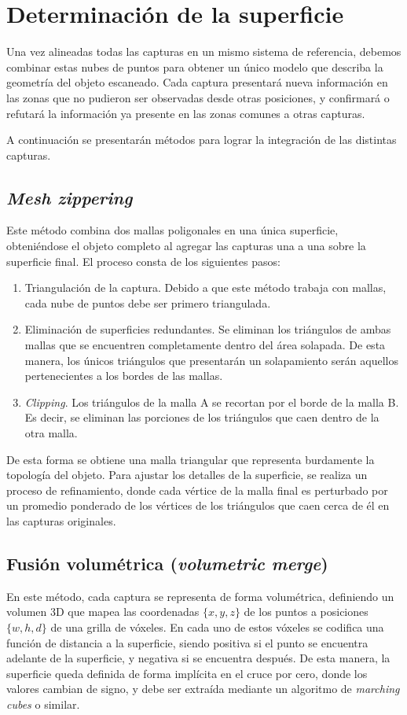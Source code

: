\section{Determinación de la superficie}
Una vez alineadas todas las capturas en un mismo sistema de referencia,
debemos combinar estas nubes de puntos para obtener un único modelo
que describa la geometría del objeto escaneado.
Cada captura presentará nueva información en las zonas
que no pudieron ser observadas desde otras posiciones,
y confirmará o refutará la información ya presente en las zonas comunes a otras capturas.

A continuación se presentarán métodos para lograr la integración de las distintas capturas.

\subsection{\emph{Mesh zippering}}
Este método combina dos mallas poligonales en una única superficie,
obteniéndose el objeto completo al agregar las capturas una a una sobre la superficie final.
El proceso consta de los siguientes pasos:
\begin{enumerate}
	\item Triangulación de la captura.
		Debido a que este método trabaja con mallas, cada nube de puntos debe ser primero triangulada.
	\item Eliminación de superficies redundantes.
		Se eliminan los triángulos de ambas mallas que se encuentren completamente dentro del área solapada.
		De esta manera, los únicos triángulos que presentarán un solapamiento
		serán aquellos pertenecientes a los bordes de las mallas.
	\item \emph{Clipping}.
		Los triángulos de la malla A se recortan por el borde de la malla B.
		Es decir, se eliminan las porciones de los triángulos que caen dentro de la otra malla.
\end{enumerate}

De esta forma se obtiene una malla triangular que representa burdamente la topología del objeto.
Para ajustar los detalles de la superficie, se realiza un proceso de refinamiento,
donde cada vértice de la malla final es perturbado por un promedio ponderado
de los vértices de los triángulos que caen cerca de él en las capturas originales\cite{Turk:1994:ZPM:192161.192241}.


\subsection{Fusión volumétrica (\emph{volumetric merge})}
En este método, cada captura se representa de forma volumétrica,
definiendo un volumen 3D que mapea las coordenadas $\{x, y, z\}$ de los puntos a posiciones $\{w, h, d\}$
de una grilla de vóxeles.
En cada uno de estos vóxeles se codifica una función de distancia a la superficie,
siendo positiva si el punto se encuentra adelante de la superficie, y negativa si se encuentra después.
De esta manera, la superficie queda definida de forma implícita en el cruce por cero,
donde los valores cambian de signo, y debe ser extraída
mediante un algoritmo de \emph{marching cubes} o similar.

